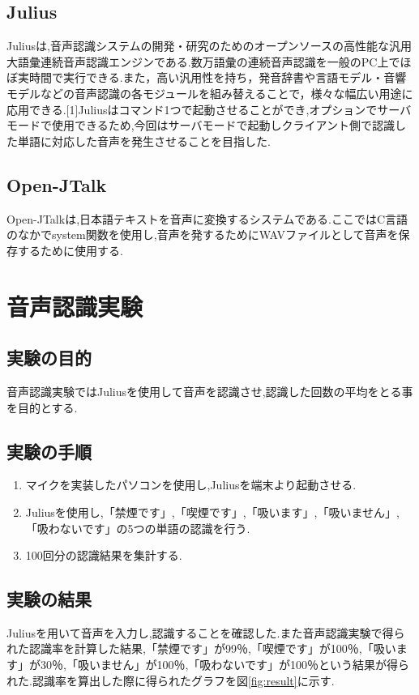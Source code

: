 \documentclass[twocolumn,11pt]{sotsuken_abst}
\begin{document}
\subsection{Julius}
Juliusは,音声認識システムの開発・研究のためのオープンソースの高性能な汎用大語彙連続音声認識エンジンである.数万語彙の連続音声認識を一般のPC上でほぼ実時間で実行できる.また，高い汎用性を持ち，発音辞書や言語モデル・音響モデルなどの音声認識の各モジュールを組み替えることで，様々な幅広い用途に応用できる.[1]Juliusはコマンド1つで起動させることができ,オプションでサーバモードで使用できるため,今回はサーバモードで起動しクライアント側で認識した単語に対応した音声を発生させることを目指した.


\subsection{Open-JTalk}
Open-JTalkは,日本語テキストを音声に変換するシステムである.ここではC言語のなかでsystem関数を使用し,音声を発するためにWAVファイルとして音声を保存するために使用する.


\section{音声認識実験}
\subsection{実験の目的}
音声認識実験ではJuliusを使用して音声を認識させ,認識した回数の平均をとる事を目的とする.


\subsection{実験の手順}

\begin{enumerate}
 \item マイクを実装したパソコンを使用し,Juliusを端末より起動させる.
 \item Juliusを使用し,「禁煙です」,「喫煙です」,「吸います」,「吸いません」,「吸わないです」の5つの単語の認識を行う.
 \item 100回分の認識結果を集計する.
\end{enumerate}

\subsection{実験の結果}
Juliusを用いて音声を入力し,認識することを確認した.また音声認識実験で得られた認識率を計算した結果,「禁煙です」が99％,「喫煙です」が100％,「吸います」が30％,「吸いません」が100％,「吸わないです」が100％という結果が得られた.認識率を算出した際に得られたグラフを図\ref{fig:result}に示す.
\end{document}

